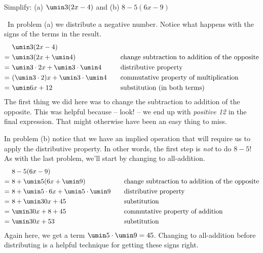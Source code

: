 \begin{boxex}
Simplify: (a) $\umin3(2x - 4)$ \quad and \quad (b) $8-5(6x-9)$

\exsoln\ In problem (a) we distribute a negative number. Notice what happens with the signs of the terms in the result.
\[\begin{aligned}
&~ \umin3(2x - 4)&&\\
=&~ \umin3(2x + \umin4)
&& \quad \text{change subtraction to addition of the opposite}\\
=&~ \umin3 \cdot 2x + \umin3 \cdot \umin4
&& \quad \text{distributive property}\\
=&~ (\umin3 \cdot 2)x + \umin3 \cdot \umin4
&& \quad \text{commutative property of multiplication}\\
=&~ \umin6x + 12
&& \quad \text{substitution (in both terms)}\\
\end{aligned}\]
The first thing we did here was to change the subtraction to addition of the opposite. This was helpful because -- look! -- we end up with \textit{positive 12} in the final expression. That might otherwise have been an easy thing to miss.

In problem (b) notice that we have an implied operation that will require us to apply the distributive property. In other words, the first step is \textit{not} to do $8-5$! As with the last problem, we'll start by changing to all-addition.
\[\begin{aligned}
&~ 8-5(6x-9)&&\\
=&~ 8+\umin5(6x + \umin9)
&& \quad \text{change subtraction to addition of the opposite}\\
=&~ 8 + \umin5\cdot6x + \umin5\cdot\umin9
&& \quad \text{distributive property}\\
=&~ 8 + \umin30x + 45
&& \quad \text{substitution}\\
=&~ \umin30x + 8 + 45
&& \quad \text{commutative property of addition}\\
=&~ \umin30x + 53
&& \quad \text{substitution}\\
\end{aligned}\]
Again here, we get a term $\umin5\cdot\umin9 = 45$. Changing to all-addition before distributing is a helpful technique for getting these signs right.
\end{boxex}

